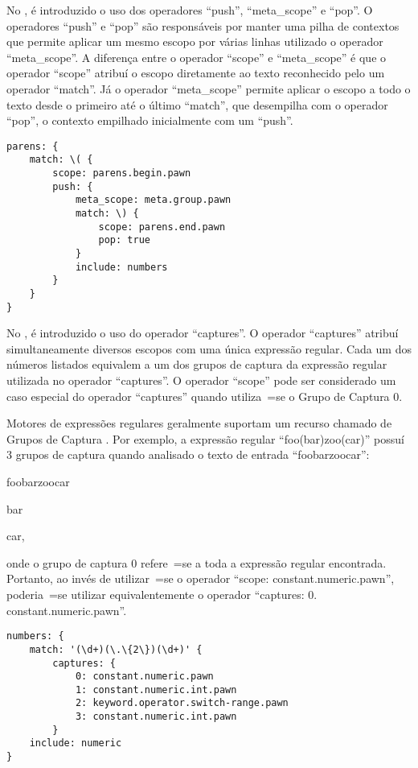 No ,
é introduzido o uso dos operadores ``push'',
``meta\_scope'' e
``pop''.
O operadores ``push'' e
``pop'' são responsáveis por manter uma pilha de contextos que permite aplicar um mesmo escopo por várias linhas utilizado o operador ``meta\_scope''.
A diferença entre o operador ``scope'' e
``meta\_scope'' é que o operador ``scope'' atribuí o escopo diretamente ao texto reconhecido pelo um operador ``match''.
Já o operador ``meta\_scope'' permite aplicar o escopo a todo o texto desde o primeiro até o último ``match'',
que desempilha com o operador ``pop'',
o contexto empilhado inicialmente com um ``push''.
\begin{lstlisting}[caption={Exemplo de Gramática -- Contextos},label={exemploDeGramaticaPawn2},style=yaml_style]
parens: {
    match: \( {
        scope: parens.begin.pawn
        push: {
            meta_scope: meta.group.pawn
            match: \) {
                scope: parens.end.pawn
                pop: true
            }
            include: numbers
        }
    }
}
\end{lstlisting}

No ,
é introduzido o uso do operador ``captures''.
O operador ``captures'' atribuí simultaneamente diversos escopos com uma única expressão regular.
Cada um dos números listados equivalem a um dos grupos de captura da expressão regular utilizada no operador ``captures''.
O operador ``scope'' pode ser considerado um caso especial do operador ``captures'' quando utiliza~=se o Grupo de Captura 0.

Motores de expressões regulares geralmente suportam um recurso chamado de Grupos de Captura \cite{expressionGrammarsWithRegexLikeCaptures}.
Por exemplo,
a expressão regular ``foo(bar)zoo(car)'' possuí 3 grupos de captura quando analisado o texto de entrada ``foobarzoocar'':
\begin{inparaenum}[1)] \setcounter{enumi}{-1}
\item foobarzoocar
\item bar
\item car,
\end{inparaenum}%
onde o grupo de captura 0 refere~=se a toda a expressão regular encontrada.
Portanto,
ao invés de utilizar~=se o operador ``scope:
constant.numeric.pawn'',
poderia~=se utilizar equivalentemente o operador ``captures:
0.
constant.numeric.pawn''.
\begin{lstlisting}[caption={Exemplo de Gramática -- Grupos de Captura},label={exemploDeGramaticaPawn3},style=yaml_style]
numbers: {
    match: '(\d+)(\.\{2\})(\d+)' {
        captures: {
            0: constant.numeric.pawn
            1: constant.numeric.int.pawn
            2: keyword.operator.switch-range.pawn
            3: constant.numeric.int.pawn
        }
    include: numeric
}
\end{lstlisting}

